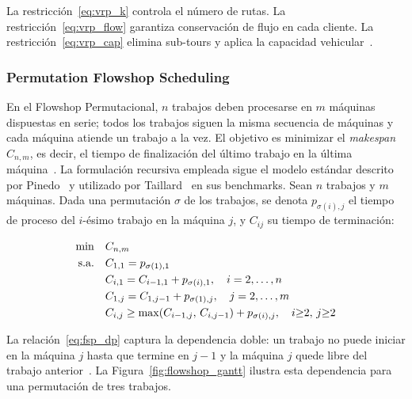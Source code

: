 La restricción~\eqref{eq:vrp_k} controla el número de rutas.
La restricción~\eqref{eq:vrp_flow} garantiza conservación de flujo en
cada cliente.
La restricción~\eqref{eq:vrp_cap} elimina sub-tours y aplica la
capacidad vehicular~\cite{dantzig1959truck}.

\subsubsection{Permutation Flowshop Scheduling}
En el Flowshop Permutacional, $n$ trabajos deben procesarse en $m$ máquinas
dispuestas en serie; todos los trabajos siguen la misma secuencia de máquinas
y cada máquina atiende un trabajo a la vez.
El objetivo es minimizar el \emph{makespan}~$C_{n,m}$, es decir, el tiempo
de finalización del último trabajo en la última máquina~\cite{pinedo2016scheduling}.
La formulación recursiva empleada sigue el modelo estándar descrito por
Pinedo~\cite{pinedo2016scheduling} y utilizado por
Taillard~\cite{taillard1993benchmarks} en sus benchmarks.
Sean $n$ trabajos y $m$ máquinas.
Dada una permutación $\sigma$ de los trabajos, se denota
$p_{\sigma(i),j}$ el tiempo de proceso del $i$-ésimo trabajo en la
máquina $j$, y $C_{ij}$ su tiempo de terminación:

\begin{align}
  \min \quad & C_{n,m} \label{eq:fsp_obj}\\
  \text{s.a.}\quad
             & C_{1,1} = p_{\sigma(1),1} \notag\\
             & C_{i,1} = C_{i-1,1} + p_{\sigma(i),1},
               \quad i = 2,\ldots,n \label{eq:fsp_m1}\\
             & C_{1,j} = C_{1,j-1} + p_{\sigma(1),j},
               \quad j = 2,\ldots,m \label{eq:fsp_j1}\\
             & C_{i,j} \geq \max(C_{i-1,j},\, C_{i,j-1})
               + p_{\sigma(i),j},\quad i{\geq}2,\,j{\geq}2
               \label{eq:fsp_dp}
\end{align}

La relación~\eqref{eq:fsp_dp} captura la dependencia doble: un trabajo
no puede iniciar en la máquina $j$ hasta que termine en $j{-}1$ y la
máquina $j$ quede libre del trabajo anterior~\cite{taillard1993benchmarks}.
La Figura~\ref{fig:flowshop_gantt} ilustra esta dependencia para una
permutación de tres trabajos.

